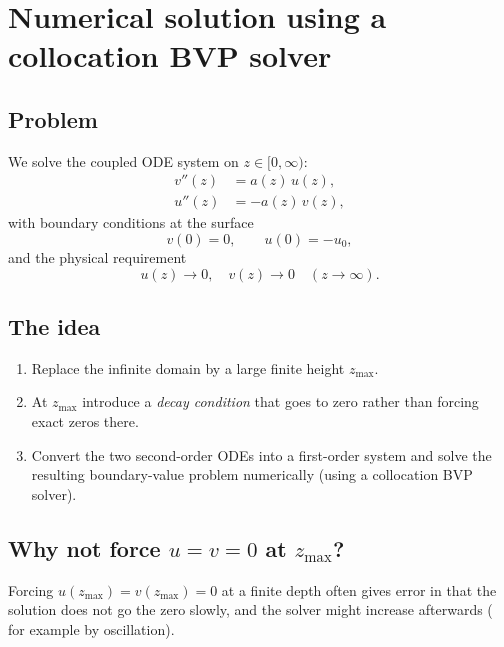 \section{Numerical solution using a collocation BVP solver}
\subsection{Problem}
We solve the coupled ODE system on \(z\in[0,\infty)\):
\[
\begin{aligned}
v''(z) &= a(z)\,u(z),\\[4pt]
u''(z) &= -a(z)\,v(z),
\end{aligned}
\]
with boundary conditions at the surface
\[
v(0)=0,\qquad u(0)=-u_0,
\]
and the physical requirement
\[
u(z)\to 0,\quad v(z)\to 0 \quad (z\to\infty).
\]

\subsection{The idea}
\begin{enumerate}
  \item Replace the infinite domain by a large finite height \(z_{\max}\).
  \item At \(z_{\max}\) introduce a \emph{decay condition} that goes to zero rather than forcing exact zeros there.
  \item Convert the two second-order ODEs into a first-order system and solve the resulting boundary-value problem numerically (using a collocation BVP solver).
\end{enumerate}

\subsection{Why not force \(u=v=0\) at \(z_{\max}\)?}
Forcing \(u(z_{\max})=v(z_{\max})=0\) at a finite depth often gives error in that the solution does not go the zero slowly, and the solver might increase afterwards ( for example by oscillation). 

